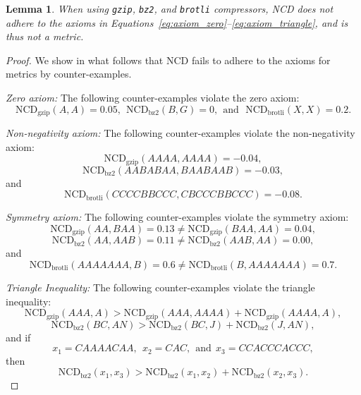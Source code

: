 \documentclass[preprint,12pt]{article}
\newtheorem{lemma}{Lemma}
\begin{document}
\begin{lemma}
    When using \texttt{gzip}, \texttt{bz2}, and \texttt{brotli} compressors, NCD does not adhere to the axioms in Equations~\ref{eq:axiom_zero}--\ref{eq:axiom_triangle}, and is thus not a metric.
    \label{pseudometric}
\end{lemma}
\begin{proof}


    We show in what follows that NCD fails to adhere to the axioms for metrics by counter-examples.

    \vspace{0.5em}
    \noindent%
    \textit{Zero axiom:} The following counter-examples violate the zero axiom:
    $$
    \text{NCD}_{\text{gzip}}(A,A) = 0.05,~~\text{NCD}_{\text{bz2}}(B,G) = 0,~~\text{and~~NCD}_{\text{brotli}}(X,X) = 0.2.
    $$

    \vspace{0.5em}
    \noindent%
    \textit{Non-negativity axiom:} The following counter-examples violate the non-nega\-tivity axiom:
    $$
        \text{NCD}_{\text{gzip}}(AAAA,AAAA) = -0.04,
    $$
    $$
        \text{NCD}_{\text{bz2}}(AABABAA,BAABAAB) = -0.03,
    $$
    and
    $$
        \text{NCD}_{\text{brotli}}(CCCCBBCCC, CBCCCBBCCC) = -0.08.
    $$

    \vspace{0.5em}
    \noindent%
    \textit{Symmetry axiom:} The following counter-examples violate the symmetry axiom:
    $$
        \text{NCD}_{\text{gzip}}(AA, BAA) = 0.13 \neq \text{NCD}_{\text{gzip}}(BAA, AA) = 0.04,
    $$
    $$
        \text{NCD}_{\text{bz2}}(AA, AAB) = 0.11 \neq \text{NCD}_{\text{bz2}}(AAB, AA) = 0.00,
    $$
    and
    $$
        \text{NCD}_{\text{brotli}}(AAAAAAA, B) = 0.6 \neq \text{NCD}_{\text{brotli}}(B, AAAAAAA) = 0.7.
    $$

    \vspace{0.5em}
    \noindent%
    \textit{Triangle Inequality:} The following counter-examples violate the triangle inequality:
    $$
        \text{NCD}_{\text{gzip}}(AAA, A) > \text{NCD}_{\text{gzip}}(AAA, AAAA) + \text{NCD}_{\text{gzip}}(AAAA, A),
    $$
    $$
        \text{NCD}_{\text{bz2}}(BC, AN) > \text{NCD}_{\text{bz2}}(BC, J) + \text{NCD}_{\text{bz2}}(J, AN),
    $$
    and if
    $$
     x_1 = CAAAACAA,~~x_2 = CAC,~~\text{and}~~x_3 = CCACCCACCC,
    $$
    then
    $$
        \text{NCD}_{\text{bz2}}(x_1,x_3) > \text{NCD}_{\text{bz2}}(x_1,x_2) + \text{NCD}_{\text{bz2}}(x_2,x_3).
    $$
\end{proof}
\end{document}
